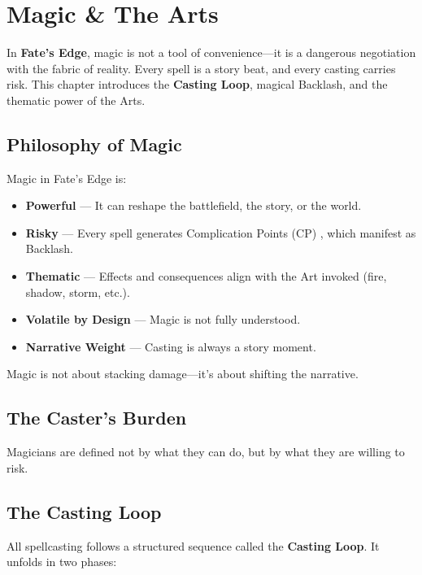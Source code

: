 
\chapter{Magic \& The Arts}
\label{ch:magic}

In \textbf{Fate's Edge}, magic is not a tool of convenience—it is a dangerous negotiation with the fabric of reality. Every spell is a story beat, and every casting carries risk. This chapter introduces the \textbf{Casting Loop}, magical Backlash, and the thematic power of the Arts.

\section{Philosophy of Magic}

Magic in Fate's Edge is:

\begin{itemize}
  \item \textbf{Powerful} — It can reshape the battlefield, the story, or the world.
  \item \textbf{Risky} — Every spell generates Complication Points (CP) , which manifest as Backlash.
  \item \textbf{Thematic} — Effects and consequences align with the Art invoked (fire, shadow, storm, etc.).
  \item \textbf{Volatile by Design} — Magic is not fully understood.
  \item \textbf{Narrative Weight} — Casting is always a story moment.
\end{itemize}

Magic is not about stacking damage—it's about shifting the narrative.

\section{The Caster's Burden}

Magicians are defined not by what they can do, but by what they are willing to risk.

\section{The Casting Loop}

All spellcasting follows a structured sequence called the \textbf{Casting Loop}. It unfolds in two phases:

